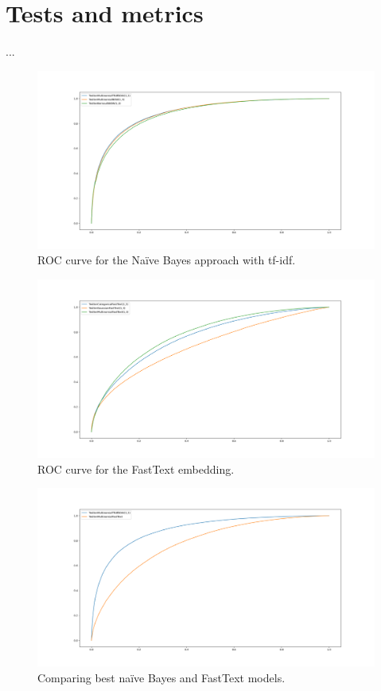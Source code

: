 \section*{Tests and metrics}

...

\begin{figure}[h!t]
    \centering
    \includegraphics[scale=0.25]{../experiments/plots/TwitterBOWTfidf}
    \caption{ROC curve for the Na\"ive Bayes approach with tf-idf.}
    \label{fig:ROCNB}        
\end{figure}

\begin{figure}[h!t]
    \centering
    \includegraphics[scale=0.25]{../experiments/plots/TwitterFastText}
    \caption{ROC curve for the FastText embedding.}
    \label{fig:ROCFT}
\end{figure}

\begin{figure}[h!t]
    \centering
    \includegraphics[scale=0.25]{../experiments/plots/BOWFastText}
    \caption{Comparing best na\"ive Bayes and FastText models.}
    \label{fig:BOWFT}
\end{figure}

